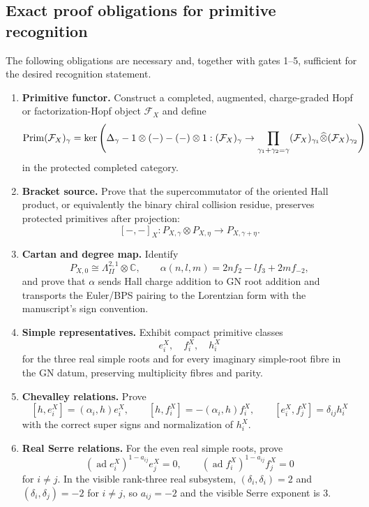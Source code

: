 \subsection{Exact proof obligations for primitive recognition}

The following obligations are necessary and, together with gates 1--5,
sufficient for the desired recognition statement.

\begin{enumerate}
\item \textbf{Primitive functor.}  Construct a completed, augmented,
charge-graded Hopf or factorization-Hopf object \(\mathcal F_X\) and
define
\[
\operatorname{Prim}(\mathcal F_X)_\gamma
=
\ker\left(
\Delta_\gamma-1\otimes(-)-(-)\otimes1:
(\mathcal F_X)_\gamma\to
\prod_{\gamma_1+\gamma_2=\gamma}
(\mathcal F_X)_{\gamma_1}\widehat\otimes
(\mathcal F_X)_{\gamma_2}
\right)
\]
in the protected completed category.

\item \textbf{Bracket source.}  Prove that the supercommutator of the
oriented Hall product, or equivalently the binary chiral collision
residue, preserves protected primitives after projection:
\[
[-,-]_X:
P_{X,\gamma}\otimes P_{X,\eta}\to P_{X,\gamma+\eta}.
\]

\item \textbf{Cartan and degree map.}  Identify
\[
P_{X,0}\cong \Lambda^{2,1}_{II}\otimes\mathbb C,\qquad
\alpha(n,l,m)=2nf_2-lf_3+2mf_{-2},
\]
and prove that \(\alpha\) sends Hall charge addition to GN root
addition and transports the Euler/BPS pairing to the Lorentzian form
with the manuscript's sign convention.

\item \textbf{Simple representatives.}  Exhibit compact primitive
classes
\[
e_i^X,\quad f_i^X,\quad h_i^X
\]
for the three real simple roots and for every imaginary simple-root
fibre in the GN datum, preserving multiplicity fibres and parity.

\item \textbf{Chevalley relations.}  Prove
\[
[h,e_i^X]=(\alpha_i,h)e_i^X,\qquad
[h,f_i^X]=-(\alpha_i,h)f_i^X,\qquad
[e_i^X,f_j^X]=\delta_{ij}h_i^X
\]
with the correct super signs and normalization of \(h_i^X\).

\item \textbf{Real Serre relations.}  For the even real simple roots,
prove
\[
(\operatorname{ad}e_i^X)^{1-a_{ij}}e_j^X=0,\qquad
(\operatorname{ad}f_i^X)^{1-a_{ij}}f_j^X=0
\]
for \(i\ne j\).  In the visible rank-three real subsystem,
\((\delta_i,\delta_i)=2\) and \((\delta_i,\delta_j)=-2\) for
\(i\ne j\), so \(a_{ij}=-2\) and the visible Serre exponent is \(3\).


\end{enumerate}

